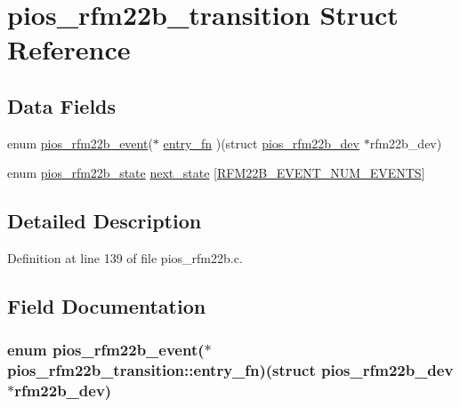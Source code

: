\hypertarget{structpios__rfm22b__transition}{\section{pios\-\_\-rfm22b\-\_\-transition Struct Reference}
\label{structpios__rfm22b__transition}
}
\subsection*{Data Fields}
\begin{DoxyCompactItemize}
\item 
enum \hyperlink{group___p_i_o_s___r_f_m22_b_gafefba9f85ea9fb8d2c610fe3759a00c2}{pios\-\_\-rfm22b\-\_\-event}($\ast$ \hyperlink{structpios__rfm22b__transition_ae70a8d2b5835fa8b0056185581d9cbeb}{entry\-\_\-fn} )(struct \hyperlink{structpios__rfm22b__dev}{pios\-\_\-rfm22b\-\_\-dev} $\ast$rfm22b\-\_\-dev)
\item 
enum \hyperlink{group___p_i_o_s___r_f_m22_b_gaf31f5344b7afb099b3105bfff4debdca}{pios\-\_\-rfm22b\-\_\-state} \hyperlink{structpios__rfm22b__transition_a0ad51f078fbfc8b875e6a26efe0b218b}{next\-\_\-state} \mbox{[}\hyperlink{group___p_i_o_s___r_f_m22_b_ggafefba9f85ea9fb8d2c610fe3759a00c2aa1f8214c33b90c900f422b7e5c2b8f31}{R\-F\-M22\-B\-\_\-\-E\-V\-E\-N\-T\-\_\-\-N\-U\-M\-\_\-\-E\-V\-E\-N\-T\-S}\mbox{]}
\end{DoxyCompactItemize}


\subsection{Detailed Description}


Definition at line 139 of file pios\-\_\-rfm22b.\-c.



\subsection{Field Documentation}
\hypertarget{structpios__rfm22b__transition_ae70a8d2b5835fa8b0056185581d9cbeb}{
\subsubsection[{entry\-\_\-fn}]{\setlength{\rightskip}{0pt plus 5cm}enum {\bf pios\-\_\-rfm22b\-\_\-event}($\ast$ pios\-\_\-rfm22b\-\_\-transition\-::entry\-\_\-fn)(struct {\bf pios\-\_\-rfm22b\-\_\-dev} $\ast$rfm22b\-\_\-dev)}}\label{structpios__rfm22b__transition_ae70a8d2b5835fa8b0056185581d9cbeb}


